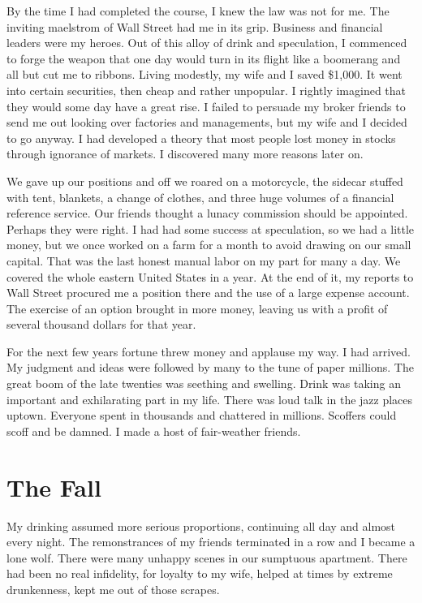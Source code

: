 By the time I had completed the course, I knew the law was not for me.
The inviting maelstrom of Wall Street had me in its grip.
Business and financial leaders were my heroes.
Out of this alloy of drink and speculation, I commenced to forge the weapon that one day would turn in its flight like a boomerang and all but cut me to ribbons.
Living modestly, my wife and I saved \$1,000.
It went into certain securities, then cheap and rather unpopular.
I rightly imagined that they would some day have a great rise.
I failed to persuade my broker friends to send me out looking over factories and managements, but my wife and I decided to go anyway.
I had developed a theory that most people lost money in stocks through ignorance of markets.
I discovered many more reasons later on.

We gave up our positions and off we roared on a motorcycle, the sidecar stuffed with tent, blankets, a change of clothes, and three huge volumes of a financial reference service.
Our friends thought a lunacy commission should be appointed.
Perhaps they were right.
I had had some success at speculation, so we had a little money, but we once worked on a farm for a month to avoid drawing on our small capital.
That was the last honest manual labor on my part for many a day.
We covered the whole eastern United States in a year.
At the end of it, my reports to Wall Street procured me a position there and the use of a large expense account.
The exercise of an option brought in more money, leaving us with a profit of several thousand dollars for that year.

For the next few years fortune threw money and applause my way.
I had arrived.
My judgment and ideas were followed by many to the tune of paper millions.
The great boom of the late twenties was seething and swelling.
Drink was taking an important and exhilarating part in my life.
There was loud talk in the jazz places uptown.
Everyone spent in thousands and chattered in millions.
Scoffers could scoff and be damned.
I made a host of fair-weather friends.


\section{The Fall}

My drinking assumed more serious proportions, continuing all day and almost every night.
The remonstrances of my friends terminated in a row and I became a lone wolf.
There were many unhappy scenes in our sumptuous apartment.
There had been no real infidelity, for loyalty to my wife, helped at times by extreme drunkenness, kept me out of those scrapes.

